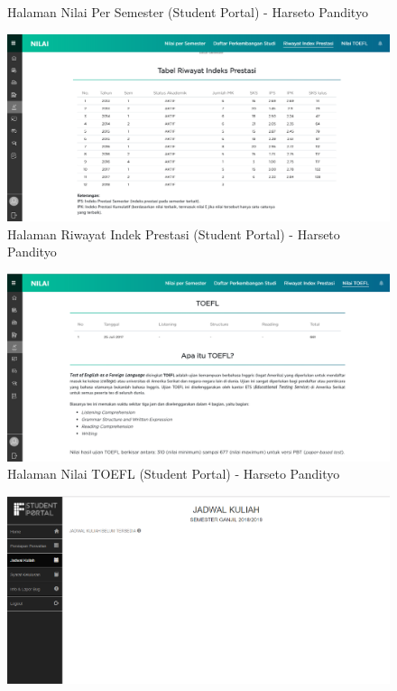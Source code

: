 \begin{itemize}
\begin{enumerate}
\begin{figure}[H]
			\caption{Halaman Nilai Per Semester (Student Portal) - Harseto Pandityo}
			\label{fig:2013_2_nps_studentportal}
		\end{figure}
		\begin{figure}[H]
			\centering
			\includegraphics[scale=0.45]{Gambar/HasilPengujian/2013_2_rip_studentportal}
			\caption{Halaman Riwayat Indek Prestasi (Student Portal) - Harseto Pandityo}
			\label{fig:2013_2_rip_studentportal}
		\end{figure}
		\begin{figure}[H]
			\centering
			\includegraphics[scale=0.45]{Gambar/HasilPengujian/2013_2_toefl_studentportal}
			\caption{Halaman Nilai TOEFL (Student Portal) - Harseto Pandityo}
			\label{fig:2013_2_toefl_studentportal}
		\end{figure}
		\begin{figure}[H]
			\centering
			\includegraphics[scale=0.45]{Gambar/HasilPengujian/2013_2_jadwal_kuliah_ifstudentportal}

\end{figure}
\end{enumerate}
\end{itemize}
